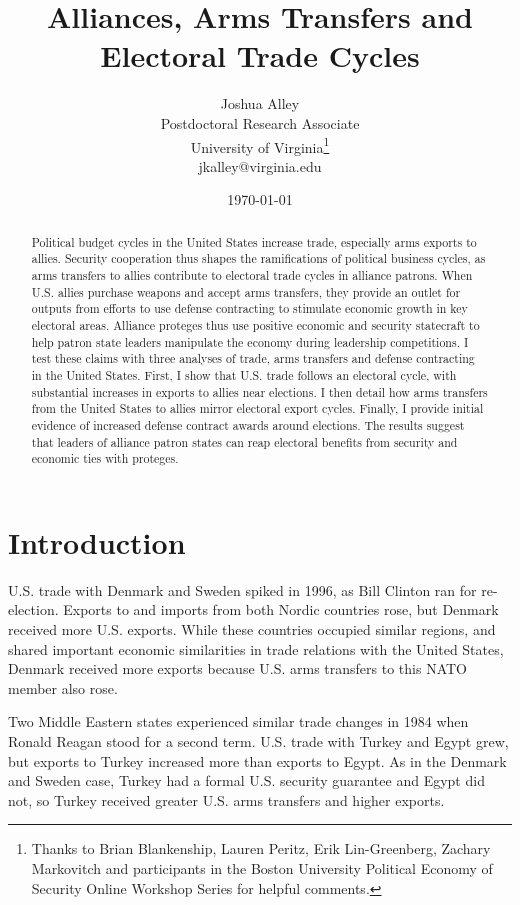 \documentclass[12pt]{article}
\title{\textbf{Alliances, Arms Transfers and Electoral Trade Cycles}}
\author{Joshua Alley \\
Postdoctoral Research Associate \\
University of Virginia\thanks{Thanks to Brian Blankenship, Lauren Peritz, Erik Lin-Greenberg, Zachary Markovitch and participants in the Boston University Political Economy of Security Online Workshop Series for helpful comments.} \\
jkalley@virginia.edu
}
\date{\today}
\begin{document}
\maketitle 

\begin{abstract} 
Political budget cycles in the United States increase trade, especially arms exports to allies. 
Security cooperation thus shapes the ramifications of political business cycles, as arms transfers to allies contribute to electoral trade cycles in alliance patrons.
When U.S. allies purchase weapons and accept arms transfers, they provide an outlet for outputs from efforts to use defense contracting to stimulate economic growth in key electoral areas.
Alliance proteges thus use positive economic and security statecraft to help patron state leaders manipulate the economy during leadership competitions.  
I test these claims with three analyses of trade, arms transfers and defense contracting in the United States. 
First, I show that U.S. trade follows an electoral cycle, with substantial increases in exports to allies near elections.
I then detail how arms transfers from the United States to allies mirror electoral export cycles. 
Finally, I provide initial evidence of increased defense contract awards around elections.
The results suggest that leaders of alliance patron states can reap electoral benefits from security and economic ties with proteges. 
\end{abstract} 


\newpage 
\doublespace 


\section{Introduction}


U.S. trade with Denmark and Sweden spiked in 1996, as Bill Clinton ran for re-election.
Exports to and imports from both Nordic countries rose, but Denmark received more U.S. exports.
While these countries occupied similar regions, and shared important economic similarities in trade relations with the United States, Denmark received more exports because U.S. arms transfers to this NATO member also rose.


Two Middle Eastern states experienced similar trade changes in 1984 when Ronald Reagan stood for a second term.
U.S. trade with Turkey and Egypt grew, but exports to Turkey increased more than exports to Egypt. 
As in the Denmark and Sweden case, Turkey had a formal U.S. security guarantee and Egypt did not, so Turkey received greater U.S. arms transfers and higher exports. 
\end{document}
